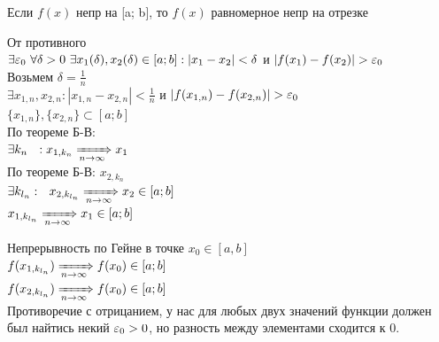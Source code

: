 \begin{theorem}[Кантора]
    Если $f(x)$ непр на [a; b], то $f(x)$ равномерное непр на отрезке
\end{theorem}

\begin{Proof}
    От противного\\
    $\exists \varepsilon_0~ \forall \delta > 0~ \exists x_1(\delta), x_2(\delta)\in [a; b]: |x_1 - x_2| < \delta$ и $|f(x_1) - f(x_2)| > \varepsilon_0$\\
    Возьмем $\delta = \frac{1}{n}~$\\$ \exists x_{1, n}, x_{2, n}: |x_{1, n} - x_{2, n}| < \frac{1}{n}$ и $|f(x_{1, n}) - f(x_{2, n})| > \varepsilon_0$\\
    $\{x_{1, n}\}, \{x_{2, n}\} \subset [a; b]$\\
    По теореме Б-В:\\
    $\exists k_n~~: x_{1, k_n} \xRightarrow[n \rightarrow \infty]{} x_1$\\
    По теореме Б-В: $x_{2, k_n}$\\
    $\exists k_{l_n}:~~ x_{2, k_{l_n}} \xRightarrow[n \rightarrow \infty]{} x_2 \in [a; b]$\\
    $x_{1, k_{l_n}}\xRightarrow[n \rightarrow \infty]{} x_1 \in [a; b]$

    \begin{center}
\end{center}
    Непрерывность по Гейне в точке $x_0 \in [a, b]$\\
    $f(x_{1, k_{l_n}})\xRightarrow[n \rightarrow \infty]{} f(x_0) \in [a; b]$\\
    $f(x_{2, k_{l_n}})\xRightarrow[n \rightarrow \infty]{} f(x_0) \in [a; b]$\\
    Противоречие с отрицанием, у нас для любых двух значений функции должен был найтись некий $\varepsilon_0 > 0$, но разность между элементами сходится к 0.
\end{Proof}

